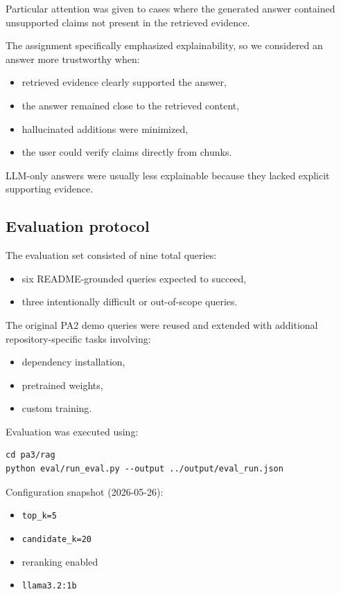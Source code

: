 \documentclass[11pt,a4paper]{article}
\begin{document}
Particular attention was given to cases where the generated answer contained unsupported claims not present in the retrieved evidence.

The assignment specifically emphasized explainability, so we considered an answer more trustworthy when:

\begin{itemize}
  \item retrieved evidence clearly supported the answer,
  \item the answer remained close to the retrieved content,
  \item hallucinated additions were minimized,
  \item the user could verify claims directly from chunks.
\end{itemize}

LLM-only answers were usually less explainable because they lacked explicit supporting evidence.

\subsection{Evaluation protocol}
The evaluation set consisted of nine total queries:

\begin{itemize}
  \item six README-grounded queries expected to succeed,
  \item three intentionally difficult or out-of-scope queries.
\end{itemize}

The original PA2 demo queries were reused and extended with additional repository-specific tasks involving:

\begin{itemize}
  \item dependency installation,
  \item pretrained weights,
  \item custom training.
\end{itemize}

Evaluation was executed using:

\begin{verbatim}
cd pa3/rag
python eval/run_eval.py --output ../output/eval_run.json
\end{verbatim}

Configuration snapshot (2026-05-26):

\begin{itemize}
  \item \texttt{top\_k=5}
  \item \texttt{candidate\_k=20}
  \item reranking enabled
  \item \texttt{llama3.2:1b}
\end{itemize}
\end{document}
